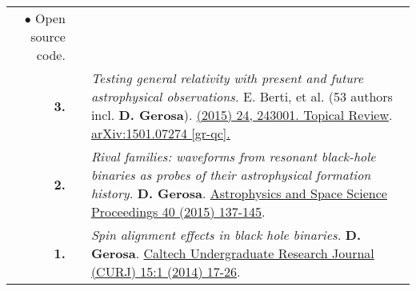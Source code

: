 {\begin{longtable}{rp{0.3cm}p{15.8cm}}
\textcolor{color1}{$\bullet$} Open source code.
\vspace{0.09cm}\\
%
\textbf{3.} & & \textit{Testing general relativity with present and future astrophysical observations.}
\newline{}
E. Berti, et al. (53 authors incl. \textbf{D. Gerosa}).
\newline{}
\href{http://dx.doi.org/10.1088/0264-9381/32/24/243001}{\cqg 32 (2015) 24, 243001. Topical Review}. \href{https://arxiv.org/abs/1501.07274}{arXiv:1501.07274 [gr-qc].}
\vspace{0.09cm}\\
%
\textbf{2.} & & \textit{Rival families: waveforms from resonant black-hole binaries as probes of their astrophysical formation history.}
\newline{}
\textbf{D. Gerosa}.
\newline{}
\href{http://dx.doi.org/10.1007/978-3-319-10488-1_12}{Astrophysics and Space Science Proceedings 40 (2015) 137-145}. 
\vspace{0.09cm}\\
%
\textbf{1.} & & \textit{Spin alignment effects in black hole binaries.}
\newline{}
\textbf{D. Gerosa}.
\newline{}
\href{https://caltechcampuspubs.library.caltech.edu/2800/}{Caltech Undergraduate Research Journal (CURJ) 15:1 (2014) 17-26}. 
\vspace{0.09cm}\\
%
\end{longtable} }